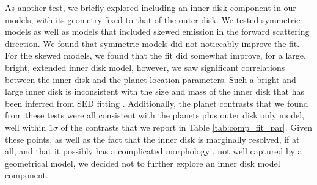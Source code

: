 \documentclass[11pt,twocolumn,twocolappendix]{aastex631}
\newcommand{\gc}[1]{\textcolor{gabonavy}{GC: #1}}
\newcommand{\rdnote}[1]{{\color{red} [R.D.: #1]}}
\begin{document}

{As another test, we briefly explored including an inner disk component in our {models}, with its geometry fixed to that of the outer disk. We tested symmetric models as well as models that included skewed emission in the forward scattering direction. We found that symmetric models did not noticeably improve the fit. For the skewed models, we found that the fit did somewhat improve, for a large, bright, extended inner disk model, however, we saw significant correlations between the inner disk and the planet location parameters. {Such a bright and large inner disk is inconsistent with the size and mass of the inner disk that has been inferred from SED fitting \citep[e.g.,][]{2024arXiv240309970G}.} {Additionally, the planet contrasts that we found from these tests were all consistent with the planets plus outer disk only model, well within $1\sigma$ of the contrasts that we report in Table \ref{tab:comp_fit_par}.} Given these points, as well as the fact that the inner disk is marginally resolved, if at all, and that it possibly has a complicated morphology \citep{2019A&A...632A..25M,2022MNRAS.513.5790C}, not well captured by a geometrical model, we decided not to further explore an inner disk model component.} %


\end{document}
